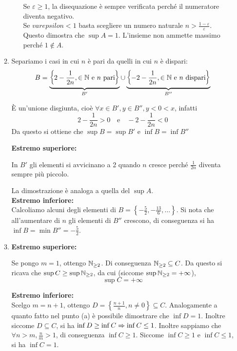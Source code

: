\documentclass{article}
\begin{document}
\begin{enumerate}[label=\textbf{Esercizio 3.\arabic*.},itemindent=*]
\begin{enumerate}
\begin{itemize}
            Se $\varepsilon \geq 1$, la disequazione è sempre verificata perché il numeratore diventa negativo. \\Se $varepsilon<1$ basta scegliere un numero naturale $n>\frac{1-\varepsilon}{\varepsilon}$.\\Questo dimostra che $\sup A=1$. L'insieme non ammette massimo perché $1\notin A$.
        \end{itemize}
        \item Separiamo i casi in cui $n$ è pari da quelli in cui $n$ è dispari:
        \[B=\underbrace{\left\{2-\frac{1}{2n}, \in \mathbb{N} \text{ e }n\text{ pari}\right\}}_{B'}\cup\underbrace{\left\{-2-\frac{1}{2n}, \in \mathbb{N} \text{ e }n\text{ dispari}\right\}}_{B''}\]
        \begin{oss}
            È un'unione disgiunta, cioè $\forall x \in B', y\in B'', y<0<x$, infatti 
                \[2-\frac{1}{2n}>0\text{~~ e ~~}-2-\frac{1}{2n}<0\]
            Da questo si ottiene che $\sup B=\sup B'$ e $\inf B=\inf B''$     
        \end{oss}
        \textbf{Estremo superiore:}
        \begin{oss}
            In $B'$ gli elementi si avvicinano a 2 quando $n$ cresce perché $\frac{1}{2n}$ diventa sempre più piccolo. 
        \end{oss}
        La dimostrazione è analoga a quella del $\sup A$.\\
        \textbf{Estremo inferiore:}\\
        Calcoliamo alcuni degli elementi di $B=\left\{-\frac{5}{2},-\frac{13}{6},\dots\right\}$. Si nota che all'aumentare di $n$ gli elementi di $B''$ crescono, di conseguenza si ha $\inf B=\min B''= -\frac{5}{2}$.
        \item \textbf{Estremo superiore:}
        \begin{oss}
            Se pongo $m=1$, ottengo $\mathbb{N}_{\geq2}$. Di conseguenza $\mathbb{N}_{\geq2}\subseteq C$. Da questo si ricava che $\sup C\geq \sup \mathbb{N}_{\geq 2}$, da cui (siccome $\sup \mathbb{N}_{\geq 2}=+\infty$), \[\sup C=+\infty\]
        \end{oss}
        \textbf{Estremo inferiore:}\\
        Scelgo $m=n+1$, ottengo $D=\left\{\frac{n+1}{n}, n\neq 0\right\}\subseteq C$. Analogamente a quanto fatto nel punto (a) è possibile dimostrare che $\inf D=1$. Inoltre siccome $D\subseteq C$, si ha $\inf D\geq \inf C\Rightarrow \inf C\leq 1$. Inoltre sappiamo che $\forall n> m, \frac{n}{m}>1$, di conseguenza $\inf C\geq 1$. Siccome $\inf C\geq 1$ e $\inf C \leq 1$, si ha $\inf C=1$.
    \end{enumerate}
    

\end{enumerate}
\end{document}
